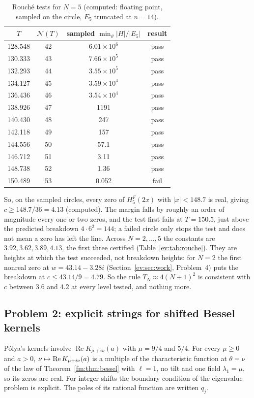 \begin{table}[h]\centering\small
\begin{tabular}{cccc}
\toprule
$T$ & $\mathcal N(T)$ & sampled $\min_\vartheta|H|/|E_5|$ & result\\
\midrule
128.548 & 42 & $6.01\times10^6$ & pass\\
130.333 & 43 & $7.66\times10^5$ & pass\\
132.293 & 44 & $3.55\times10^5$ & pass\\
134.127 & 45 & $3.59\times10^4$ & pass\\
136.436 & 46 & $3.54\times10^4$ & pass\\
138.926 & 47 & 1191 & pass\\
140.430 & 48 & 247 & pass\\
142.118 & 49 & 157 & pass\\
144.556 & 50 & 57.1 & pass\\
146.712 & 51 & 3.11 & pass\\
148.738 & 52 & 1.36 & pass\\
150.489 & 53 & 0.052 & fail\\
\bottomrule
\end{tabular}
\caption{Rouch\'e tests for $N=5$ (computed: floating point, sampled on the circle, $E_5$ truncated at $n=14$).}\label{ev:tab:rouche5}
\end{table}

So, on the sampled circles, every zero of $H^F_5(2x)$ with $|x|<148.7$ is real, giving $c\ge148.7/36=4.13$ (computed). The margin falls by roughly an order of magnitude every one or two zeros, and the test first fails at $T=150.5$, just above the predicted breakdown $4\cdot6^2=144$; a failed circle only stops the test and does not mean a zero has left the line. Across $N=2,\ldots,5$ the constants are $3.92,3.62,3.89,4.13$, the first three certified (Table~\ref{ev:tab:rouche}). They are heights at which the test succeeded, not breakdown heights: for $N=2$ the first nonreal zero at $w=43.14-3.28i$ (Section~\ref{ev:sec:work}, Problem~4) puts the breakdown at $c\le43.14/9=4.79$. So the rule $T_N\approx4(N+1)^2$ is consistent with $c$ between $3.6$ and $4.2$ at every level tested, and nothing more.

\subsection{Problem 2: explicit strings for shifted Bessel kernels}

P\'olya's kernels involve $\operatorname{Re}K_{\mu+i\nu}(a)$ with $\mu=9/4$ and $5/4$. For every $\mu\ge0$ and $a>0$, $\nu\mapsto\operatorname{Re} K_{\mu+i\nu}(a)$ is a multiple of the characteristic function at $\theta=\nu$ of the law of Theorem~\ref{fm:thm:bessel} with $\ell=1$, no tilt and one field $\lambda_1=\mu$, so its zeros are real. For integer shifts the boundary condition of the eigenvalue problem is explicit. The poles of its rational function are written $q_j$.

